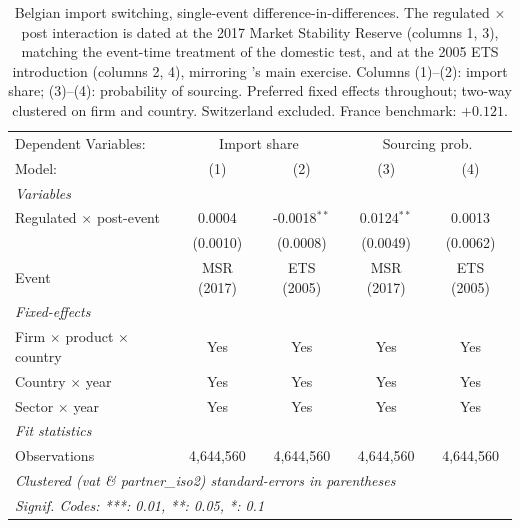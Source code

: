 
\begin{table}[htbp]
   \caption{\label{tab:cdgm_event_did} Belgian import switching, single-event difference-in-differences. The regulated $\times$ post interaction is dated at the 2017 Market Stability Reserve (columns 1, 3), matching the event-time treatment of the domestic test, and at the 2005 ETS introduction (columns 2, 4), mirroring \citet{CosterMejeanDiGiovanni2024}'s main exercise. Columns (1)--(2): import share; (3)--(4): probability of sourcing. Preferred fixed effects throughout; two-way clustered on firm and country. Switzerland excluded. France benchmark: $+0.121$.}
   \centering
   \begin{tabular}{lcccc}
      \tabularnewline \midrule \midrule
      Dependent Variables: & \multicolumn{2}{c}{Import share} & \multicolumn{2}{c}{Sourcing prob.}\\
      Model:                                   & (1)        & (2)            & (3)           & (4)\\  
      \midrule
      \emph{Variables}\\
      Regulated $\times$ post-event            & 0.0004     & -0.0018$^{**}$ & 0.0124$^{**}$ & 0.0013\\   
                                               & (0.0010)   & (0.0008)       & (0.0049)      & (0.0062)\\   
      Event                                    & MSR (2017) & ETS (2005)     & MSR (2017)    & ETS (2005)\\  
      \midrule
      \emph{Fixed-effects}\\
      Firm $\times$ product $\times$ country   & Yes        & Yes            & Yes           & Yes\\  
      Country $\times$ year                    & Yes        & Yes            & Yes           & Yes\\  
      Sector $\times$ year                     & Yes        & Yes            & Yes           & Yes\\  
      \midrule
      \emph{Fit statistics}\\
      Observations                             & 4,644,560  & 4,644,560      & 4,644,560     & 4,644,560\\  
      \midrule \midrule
      \multicolumn{5}{l}{\emph{Clustered (vat \& partner\_iso2) standard-errors in parentheses}}\\
      \multicolumn{5}{l}{\emph{Signif. Codes: ***: 0.01, **: 0.05, *: 0.1}}\\
   \end{tabular}
\end{table}


